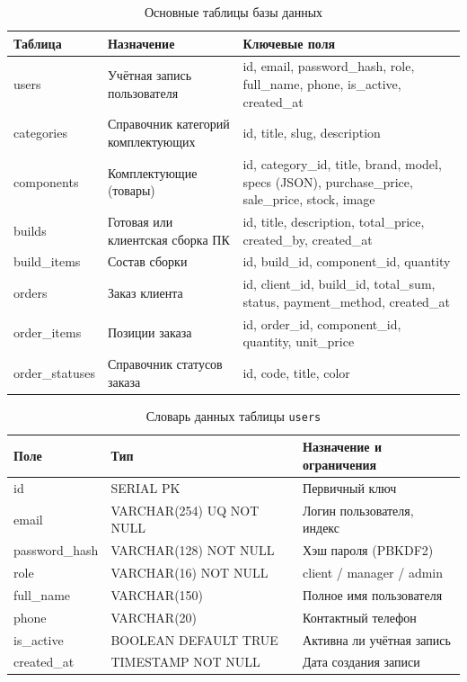 \documentclass[14pt, a4paper]{extarticle}
\begin{document}
\begin{table}[ht!]
\caption{Основные таблицы базы данных}
\label{tab:db}
\small
\begin{tabularx}{\textwidth}{|>{\RaggedRight\arraybackslash}p{}|>{\RaggedRight\arraybackslash}p{}|>{\RaggedRight\arraybackslash}X|}
\hline
\textbf{Таблица} & \textbf{Назначение} & \textbf{Ключевые поля} \\ \hline
users & Учётная запись пользователя & id, email, password\_hash, role, full\_name, phone, is\_active, created\_at \\ \hline
categories & Справочник категорий комплектующих & id, title, slug, description \\ \hline
components & Комплектующие (товары) & id, category\_id, title, brand, model, specs (JSON), purchase\_price, sale\_price, stock, image \\ \hline
builds & Готовая или клиентская сборка ПК & id, title, description, total\_price, created\_by, created\_at \\ \hline
build\_items & Состав сборки & id, build\_id, component\_id, quantity \\ \hline
orders & Заказ клиента & id, client\_id, build\_id, total\_sum, status, payment\_method, created\_at \\ \hline
order\_items & Позиции заказа & id, order\_id, component\_id, quantity, unit\_price \\ \hline
order\_statuses & Справочник статусов заказа & id, code, title, color \\ \hline
\end{tabularx}
\end{table}

\begin{table}[ht!]
\caption{Словарь данных таблицы \texttt{users}}
\label{tab:dd-users}
\small
\begin{tabularx}{\textwidth}{|>{\RaggedRight\arraybackslash}p{}|>{\RaggedRight\arraybackslash}p{}|>{\RaggedRight\arraybackslash}X|}
\hline
\textbf{Поле} & \textbf{Тип} & \textbf{Назначение и ограничения} \\ \hline
id & SERIAL PK & Первичный ключ \\ \hline
email & VARCHAR(254) UQ NOT NULL & Логин пользователя, индекс \\ \hline
password\_hash & VARCHAR(128) NOT NULL & Хэш пароля (PBKDF2) \\ \hline
role & VARCHAR(16) NOT NULL & client / manager / admin \\ \hline
full\_name & VARCHAR(150) & Полное имя пользователя \\ \hline
phone & VARCHAR(20) & Контактный телефон \\ \hline
is\_active & BOOLEAN DEFAULT TRUE & Активна ли учётная запись \\ \hline
created\_at & TIMESTAMP NOT NULL & Дата создания записи \\ \hline
\end{tabularx}
\end{table}
\end{document}
